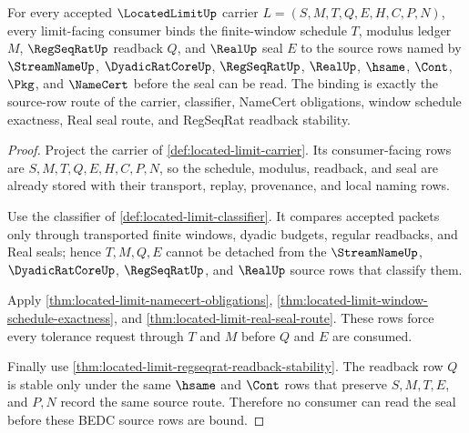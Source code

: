 \begin{theorem}
\label{thm:located-limit-source-row-scope}
For every accepted $\LocatedLimitUp$ carrier $L=(S,M,T,Q,E,H,C,P,N)$, every limit-facing consumer binds the finite-window schedule $T$, modulus ledger $M$, $\RegSeqRatUp$ readback $Q$, and $\RealUp$ seal $E$ to the source rows named by $\StreamNameUp$, $\DyadicRatCoreUp$, $\RegSeqRatUp$, $\RealUp$, $\hsame$, $\Cont$, $\Pkg$, and $\NameCert$ before the seal can be read. The binding is exactly the source-row route of the carrier, classifier, NameCert obligations, window schedule exactness, Real seal route, and RegSeqRat readback stability.
\end{theorem}
\begin{proof}
Project the carrier of \autoref{def:located-limit-carrier}. Its consumer-facing rows are $S,M,T,Q,E,H,C,P,N$, so the schedule, modulus, readback, and seal are already stored with their transport, replay, provenance, and local naming rows.

Use the classifier of \autoref{def:located-limit-classifier}. It compares accepted packets only through transported finite windows, dyadic budgets, regular readbacks, and Real seals; hence $T,M,Q,E$ cannot be detached from the $\StreamNameUp$, $\DyadicRatCoreUp$, $\RegSeqRatUp$, and $\RealUp$ source rows that classify them.

Apply \autoref{thm:located-limit-namecert-obligations}, \autoref{thm:located-limit-window-schedule-exactness}, and \autoref{thm:located-limit-real-seal-route}. These rows force every tolerance request through $T$ and $M$ before $Q$ and $E$ are consumed.

Finally use \autoref{thm:located-limit-regseqrat-readback-stability}. The readback row $Q$ is stable only under the same $\hsame$ and $\Cont$ rows that preserve $S,M,T,E$, and $P,N$ record the same source route. Therefore no consumer can read the seal before these BEDC source rows are bound.
\end{proof}

